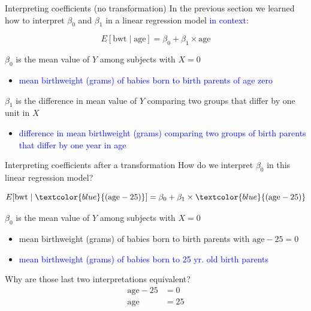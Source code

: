 \documentclass[10pt,t]{beamer}
\begin{document}
\begin{frame}{Interpreting coefficients (no transformation)}
In the previous section we learned how to interpret $\beta_0$ and $\beta_1$ in a linear regression model \textcolor{blue}{in context}:

$$
E[\text{bwt} \mid \text{age}] = \beta_0 + \beta_1 \times \text{age}
$$

\vspace{0.2cm}

$\beta_0$ is the mean value of $Y$ among subjects with $X = 0$

\begin{itemize}
	\item[] \textcolor{blue}{mean birthweight (grams) of babies born to birth parents of age zero}
\end{itemize}


\vspace{0.3cm}

$\beta_1$ is the difference in mean value of $Y$ comparing two groups that differ by one unit in $X$

\begin{itemize}
	\item[] \textcolor{blue}{difference in mean birthweight (grams) comparing two groups of birth parents that differ by one year in age}
\end{itemize} 

\end{frame}

\begin{frame}{Interpreting coefficients after a transformation}
How do we interpret $\beta_0$ in this linear regression model?

$$
E[\text{bwt} \mid \textcolor{blue}{(\text{age} - 25)}] = \beta_0 + \beta_1 \times \textcolor{blue}{(\text{age} - 25)}
$$

\vspace{0.2cm}

$\beta_0$ is the mean value of $Y$ among subjects with $X = 0$
\pause
\begin{itemize}
	\item[] mean birthweight (grams) of babies born to birth parents with $\text{age} - 25 = 0$ \pause
	\item[] \textcolor{blue}{mean birthweight (grams) of babies born to 25 yr. old birth parents } \pause
\end{itemize} 

\vspace{0.3cm}

Why are those last two interpretations equivalent?
\begin{align*}
\text{age} - 25 &= 0 \\
\text{age} & = 25
\end{align*}

\end{frame}
\end{document}
